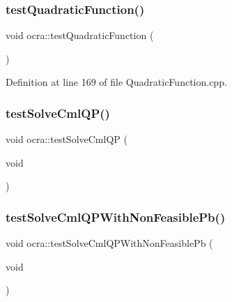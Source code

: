 \hypertarget{namespaceocra_a9b89d0c6904586983c85a015960bbc6d}{}\label{namespaceocra_a9b89d0c6904586983c85a015960bbc6d} 
\subsubsection{\texorpdfstring{test\+Quadratic\+Function()}{testQuadraticFunction()}}
{\footnotesize\ttfamily void ocra\+::test\+Quadratic\+Function (\begin{DoxyParamCaption}{ }\end{DoxyParamCaption})}



Definition at line 169 of file Quadratic\+Function.\+cpp.

\hypertarget{namespaceocra_a1622744f4ef36df9f5b67eab7c19078a}{}\label{namespaceocra_a1622744f4ef36df9f5b67eab7c19078a} 
\subsubsection{\texorpdfstring{test\+Solve\+Cml\+Q\+P()}{testSolveCmlQP()}}
{\footnotesize\ttfamily void ocra\+::test\+Solve\+Cml\+QP (\begin{DoxyParamCaption}\item[{void}]{ }\end{DoxyParamCaption})}

\hypertarget{namespaceocra_ac7bf5fa708df93404630542f6d1f0b34}{}\label{namespaceocra_ac7bf5fa708df93404630542f6d1f0b34} 
\subsubsection{\texorpdfstring{test\+Solve\+Cml\+Q\+P\+With\+Non\+Feasible\+Pb()}{testSolveCmlQPWithNonFeasiblePb()}}
{\footnotesize\ttfamily void ocra\+::test\+Solve\+Cml\+Q\+P\+With\+Non\+Feasible\+Pb (\begin{DoxyParamCaption}\item[{void}]{ }\end{DoxyParamCaption})}

